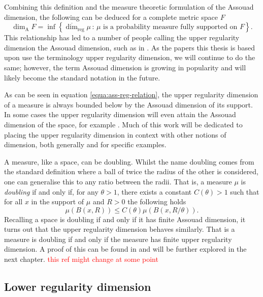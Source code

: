 Combining this definition and the measure theoretic formulation of the Assouad dimension, the following can be deduced for a complete metric space $F$
\label{equa:ass-reg-relation}
\begin{equation}
    \dim_{\text{A}} F = \inf \left\{ \overline{\dim}_{\text{reg}} \mu \,  \colon \, \mu \text{ is a probability measure fully supported on } F\right\}.
\end{equation}
This relationship has led to a number of people calling the upper regularity dimension the Assouad dimension, such as in \cite{hare-troscheit, fraser-kaenmaki, etc}. As the papers this thesis is based upon use the terminology upper regularity dimension, we will continue to do the same; however, the term Assouad dimension is growing in popularity and will likely become the standard notation in the future.

As can be seen in equation \ref{equa:ass-reg-relation}, the upper regularity dimension of a measure is always bounded below by the Assouad dimension of its support. In some cases the upper regularity dimension will even attain the Assouad dimension of the space, for example \cite[Theorem 2.3]{fraser-howroyd}. Much of this work will be dedicated to placing the upper regularity dimension in context with other notions of dimension, both generally and for specific examples.

A measure, like a space, can be doubling. Whilst the name doubling comes from the standard definition where a ball of twice the radius of the other is considered, one can generalise this to any ratio between the radii. That is, a measure $\mu$ is \textit{doubling} if and only if, for any $\theta > 1$, there exists a constant $C(\theta) > 1$ such that for all $x$ in the support of $\mu$ and $R > 0$ the following holds
\[
\mu(B(x,R)) \le C(\theta) \mu(B(x,R/\theta)).
\]
Recalling a space is doubling if and only if it has finite Assouad dimension, it turns out that the upper regularity dimension behaves similarly. That is a measure is doubling if and only if the measure has finite upper regularity dimension. A proof of this can be found in \cite[Lemma 3.2]{kaenmakinew} and will be further explored in the next chapter. \textcolor{red}{this ref might change at some point}


\subsection{Lower regularity dimension}
\label{sec:intro-lower-reg}


